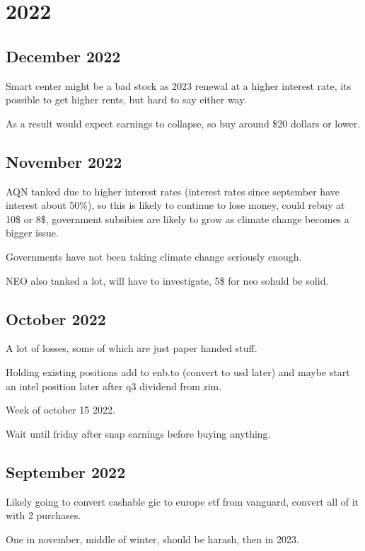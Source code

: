 \section{2022}
\subsection{December 2022}
Smart center might be a bad stock as 2023 renewal at a higher interest rate, its possible to get higher rents, but hard to say either way.

As a result would expect earnings to collapse, so buy around \$20 dollars or lower.


\subsection{November 2022}

AQN tanked due to higher interest rates (interest rates since september have interest about 50\%), so this is likely to continue to lose money, could rebuy at 10\$ or 8\$, government subsibies are likely to grow as climate change becomes a bigger issue.

Governments have not been taking climate change seriously enough.

NEO also tanked a lot, will have to investigate, 5\$ for neo sohuld be solid.
\subsection{October 2022}

A lot of losses, some of which are just paper handed stuff.

Holding existing positions add to enb.to (convert to usd later) and maybe start an intel position later after q3 dividend from zim.

Week of october 15 2022.

Wait until friday after snap earnings before buying anything.



\subsection{September 2022}

Likely going to convert cashable gic to europe etf from vanguard, convert all of it with 2 purchases.

One in november, middle of winter, should be harash, then in 2023.

